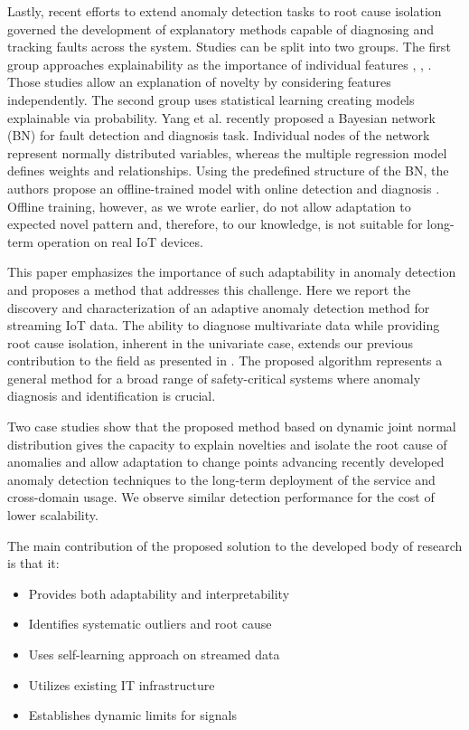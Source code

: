 Lastly, recent efforts to extend anomaly detection tasks to root cause isolation governed the development of explanatory methods capable of diagnosing and tracking faults across the system. Studies can be split into two groups. The first group approaches explainability as the importance of individual features \cite{Carletti2019}, \cite{Nguyen2019}, \cite{Amarasinghe2018}. Those studies allow an explanation of novelty by considering features independently. The second group uses statistical learning creating models explainable via probability. Yang et al. recently proposed a Bayesian network (BN) for fault detection and diagnosis task. Individual nodes of the network represent normally distributed variables, whereas the multiple regression model defines weights and relationships. Using the predefined structure of the BN, the authors propose an offline-trained model with online detection and diagnosis \cite{Yang2022}. Offline training, however, as we wrote earlier, do not allow adaptation to expected novel pattern and, therefore, to our knowledge, is not suitable for long-term operation on real IoT devices.

This paper emphasizes the importance of such adaptability in anomaly detection and proposes a method that addresses this challenge. Here we report the discovery and characterization of an adaptive anomaly detection method for streaming IoT data. The ability to diagnose multivariate data while providing root cause isolation, inherent in the univariate case, extends our previous contribution to the field as presented in \cite{Wadinger2023}. The proposed algorithm represents a general method for a broad range of safety-critical systems where anomaly diagnosis and identification is crucial.

Two case studies show that the proposed method based on dynamic joint normal distribution gives the capacity to explain novelties and isolate the root cause of anomalies and allow adaptation to change points advancing recently developed anomaly detection techniques to the long-term deployment of the service and cross-domain usage. We observe similar detection performance for the cost of lower scalability.

The main contribution of the proposed solution to the developed body of research is that it:
\begin{itemize}
\item Provides both adaptability and interpretability
\item Identifies systematic outliers and root cause
\item Uses self-learning approach on streamed data
\item Utilizes existing IT infrastructure
\item Establishes dynamic limits for signals
\end{itemize}
